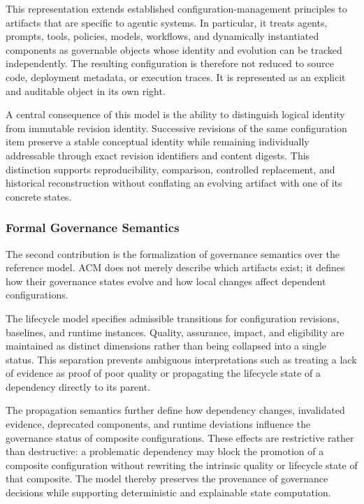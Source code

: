 \documentclass[10pt]{article}
\begin{document}
This representation extends established configuration-management principles to artifacts that are specific to agentic systems. In particular, it treats agents, prompts, tools, policies, models, workflows, and dynamically instantiated components as governable objects whose identity and evolution can be tracked independently. The resulting configuration is therefore not reduced to source code, deployment metadata, or execution traces. It is represented as an explicit and auditable object in its own right.

A central consequence of this model is the ability to distinguish logical identity from immutable revision identity. Successive revisions of the same configuration item preserve a stable conceptual identity while remaining individually addressable through exact revision identifiers and content digests. This distinction supports reproducibility, comparison, controlled replacement, and historical reconstruction without conflating an evolving artifact with one of its concrete states.

\subsubsection{Formal Governance Semantics}

The second contribution is the formalization of governance semantics over the reference model. ACM does not merely describe which artifacts exist; it defines how their governance states evolve and how local changes affect dependent configurations.

The lifecycle model specifies admissible transitions for configuration revisions, baselines, and runtime instances. Quality, assurance, impact, and eligibility are maintained as distinct dimensions rather than being collapsed into a single status. This separation prevents ambiguous interpretations such as treating a lack of evidence as proof of poor quality or propagating the lifecycle state of a dependency directly to its parent.

The propagation semantics further define how dependency changes, invalidated evidence, deprecated components, and runtime deviations influence the governance status of composite configurations. These effects are restrictive rather than destructive: a problematic dependency may block the promotion of a composite configuration without rewriting the intrinsic quality or lifecycle state of that composite. The model thereby preserves the provenance of governance decisions while supporting deterministic and explainable state computation.
\end{document}
